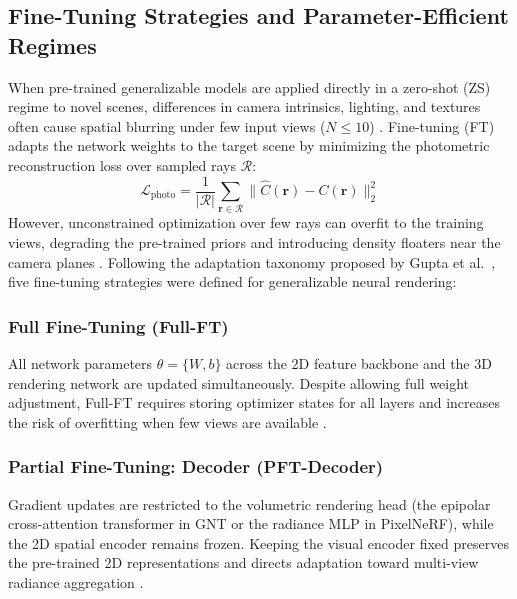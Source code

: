 \subsection{Fine-Tuning Strategies and Parameter-Efficient Regimes}
\label{sec:ft_theory}

When pre-trained generalizable models are applied directly in a zero-shot (ZS) regime to novel scenes, differences in camera intrinsics, lighting, and textures often cause spatial blurring under few input views ($N \le 10$) \cite{mildenhall2019locallightfieldfusion, yu2021pixelnerfneuralradiancefields}. Fine-tuning (FT) adapts the network weights to the target scene by minimizing the photometric reconstruction loss over sampled rays $\mathcal{R}$:
\begin{equation}
\mathcal{L}_{\text{photo}} = \frac{1}{|\mathcal{R}|} \sum_{\mathbf{r} \in \mathcal{R}} \|\hat{C}(\mathbf{r}) - C(\mathbf{r})\|_2^2
\label{eq:photo_loss}
\end{equation}
However, unconstrained optimization over few rays can overfit to the training views, degrading the pre-trained priors and introducing density floaters near the camera planes \cite{niemeyer2022regnerf, roessle2022dense}. Following the adaptation taxonomy proposed by Gupta et al.\ \cite{gupta2024beyondlora}, five fine-tuning strategies were defined for generalizable neural rendering:

\subsubsection{Full Fine-Tuning (Full-FT)}
All network parameters $\theta = \{W, b\}$ across the 2D feature backbone and the 3D rendering network are updated simultaneously. Despite allowing full weight adjustment, Full-FT requires storing optimizer states for all layers and increases the risk of overfitting when few views are available \cite{niemeyer2022regnerf, gupta2024beyondlora}.

\subsubsection{Partial Fine-Tuning: Decoder (PFT-Decoder)}
Gradient updates are restricted to the volumetric rendering head (the epipolar cross-attention transformer in GNT or the radiance MLP in PixelNeRF), while the 2D spatial encoder remains frozen. Keeping the visual encoder fixed preserves the pre-trained 2D representations and directs adaptation toward multi-view radiance aggregation \cite{gupta2024beyondlora}.

